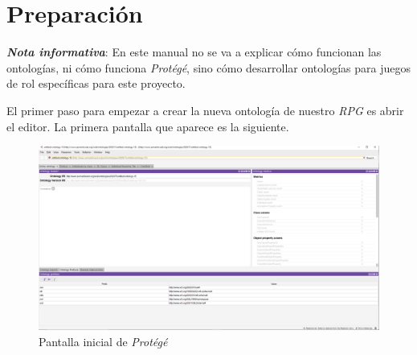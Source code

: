 
\section{Preparación}
\textit{\textbf{Nota informativa}}: En este manual no se va a explicar cómo funcionan las ontologías, ni cómo funciona \textit{Protégé}, 
sino cómo desarrollar ontologías para juegos de rol específicas para este proyecto. 

El primer paso para empezar a crear la nueva ontología de nuestro \textit{RPG} es abrir el editor. La primera pantalla que 
aparece es la siguiente.\medskip

\begin{figure}[H]
    \centering
    \includegraphics[scale=0.2]{Figures/Protege/Inicio_Protege.png}
    \caption{Pantalla inicial de \textit{Protégé}}
    \label{Inicio_protege}
\end{figure}

